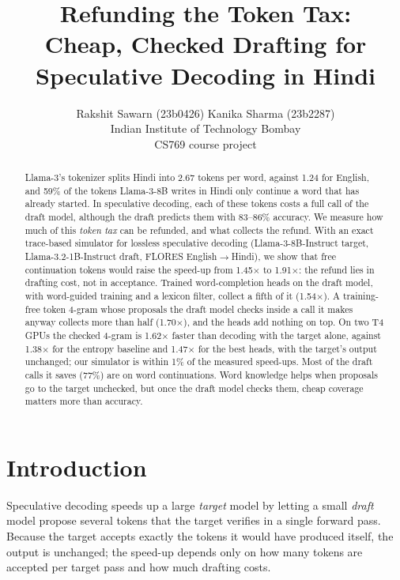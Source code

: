 \documentclass[11pt]{article}
\title{Refunding the Token Tax:\\
Cheap, Checked Drafting for Speculative Decoding in Hindi}
\author{Rakshit Sawarn (23b0426) \quad Kanika Sharma (23b2287) \\ Indian Institute of Technology Bombay \\ CS769 course project}
\date{}
\newcommand{\x}{$\times$}
\begin{document}
\maketitle

\begin{abstract}
Llama-3's tokenizer splits Hindi into 2.67 tokens per word, against 1.24 for English, and 59\% of
the tokens Llama-3-8B writes in Hindi only continue a word that has already started. In speculative
decoding, each of these tokens costs a full call of the draft model, although the draft predicts them
with 83--86\% accuracy. We measure how much of this \emph{token tax} can be refunded, and what collects
the refund. With an exact trace-based simulator for lossless speculative decoding (Llama-3-8B-Instruct
target, Llama-3.2-1B-Instruct draft, FLORES English$\to$Hindi), we show that free continuation tokens
would raise the speed-up from 1.45\x{} to 1.91\x: the refund lies in drafting cost, not in acceptance.
Trained word-completion heads on the draft model, with word-guided training and a lexicon filter,
collect a fifth of it (1.54\x). A training-free token 4-gram whose proposals the draft model checks
inside a call it makes anyway collects more than half (1.70\x), and the heads add nothing on top. On two
T4 GPUs the checked 4-gram is 1.62\x{} faster than decoding with the target alone, against 1.38\x{} for
the entropy baseline and 1.47\x{} for the best heads, with the target's output unchanged; our simulator
is within 1\% of the measured speed-ups. Most of the draft calls it saves (77\%) are on word
continuations. Word knowledge helps when proposals go to the target unchecked, but once the draft
model checks them, cheap coverage matters more than accuracy.
\end{abstract}

\section{Introduction}

Speculative decoding \citep{leviathan2023fast,chen2023accelerating} speeds up a large \emph{target}
model by letting a small \emph{draft} model propose several tokens that the target verifies in a
single forward pass. Because the target accepts exactly the tokens it would have produced itself, the
output is unchanged; the speed-up depends only on how many tokens are accepted per target pass and
how much drafting costs.
\end{document}
